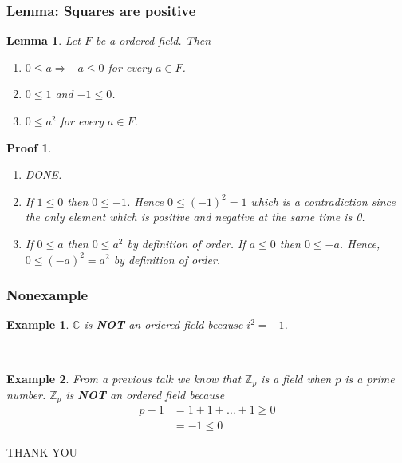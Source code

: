 \documentclass{beamer}
\def\jump{ \quad \\ \vspace{0.5cm} \pause}
\def\CC{{\mathbb C}}
\theoremstyle{thmstyle}
\newtheorem*{myproof}{Proof}
\theoremstyle{mystyle}
\newtheorem*{myexample}{Example}
\newtheorem*{mylemma}{Lemma}
\theoremstyle{qstnstyle}
\begin{document}
\begin{frame}[t]
\frametitle{Lemma: Squares are positive}
\begin{mylemma}
Let $F$ be a ordered field. Then 
\begin{enumerate}
\item $0 \leq a \Longrightarrow -a \leq 0 $ for every $a\in F$. 

\item $0 \leq 1 $  and $-1 \leq 0 $.

\item $0\leq a^2$ for every $a\in F$.
\end{enumerate}
\end{mylemma}
\pause
\begin{myproof}
\begin{enumerate}
\item DONE.
\pause \item If $1 \leq 0$ then $0 \leq -1$. Hence $0 \leq (-1)^2=1$ which is a contradiction since the only element which is positive and negative at the same time is 0.
\pause \item If $0\leq a$ then $0\leq a^2$ by definition of order. If $a \leq 0$ then $0\leq -a$. Hence, $0\leq (-a)^2=a^2$ by definition of order.
\end{enumerate}

\end{myproof}
\end{frame}

\begin{frame}[t]
\frametitle{Nonexample}
\begin{myexample}
$\CC$ is \textbf{NOT} an ordered field because $i^2=-1$.
\end{myexample}
\jump
\begin{myexample}
From a previous talk we know that $\mathbb{Z}_p$ is a field when $p$ is a prime number. $\mathbb{Z}_p$ is \textbf{NOT} an ordered field because 
\begin{equation*}
\begin{split}
p-1 & = 1+1+\ldots+1 \geq 0 \\
& = -1 \leq 0
\end{split}
\end{equation*}
\end{myexample}

\end{frame}



\begin{frame}
\begin{center}
{\Huge{THANK YOU}}
\end{center}


\end{frame}
\end{document}
